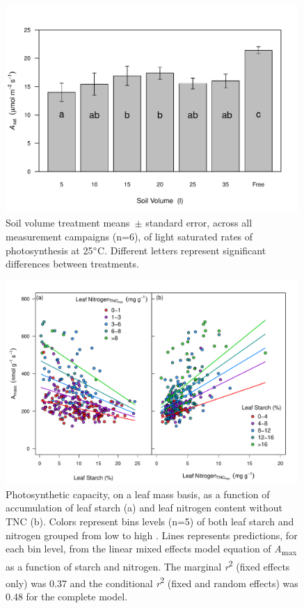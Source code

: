 \documentclass[a4paper]{article}\usepackage[]{graphicx}\usepackage[]{color}
\begin{document}
\begin{figure}[h!]
    \centering
    \includegraphics[width=0.99\textwidth]{Asat.pdf}
    \caption{Soil volume treatment means~$\pm$ standard error, across all measurement campaigns (n=6), of light saturated rates of photosynthesis at 25$\degree$C. Different letters represent significant differences between treatments.}
    \label{fig:figure4}
\end{figure}

\begin{figure}[h!]
    \centering
    \includegraphics[width=0.99\textwidth]{A_leafchem.pdf}
    \caption{Photosynthetic capacity, on a leaf mass basis, as a function of accumulation of leaf starch (a) and leaf nitrogen content without TNC (b).  Colors represent bins levels (n=5) of both leaf starch and nitrogen grouped from low to high .  Lines represents predictions, for each bin level, from the linear mixed effects model equation of \textit{A}\textsubscript{max} as a function of starch and nitrogen. The marginal \textit{r}\textsuperscript{2} (fixed effects only) was 0.37 and the conditional \textit{r}\textsuperscript{2} (fixed and random effects) was 0.48 for the complete model.}
    \label{fig:figure5}
\end{figure}
\end{document}
